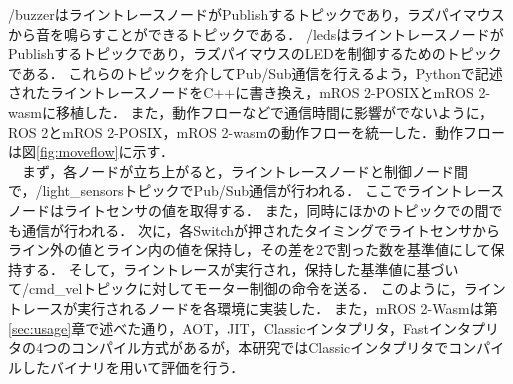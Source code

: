 /buzzerはライントレースノードがPublishするトピックであり，ラズパイマウスから音を鳴らすことができるトピックである．
/ledsはライントレースノードがPublishするトピックであり，ラズパイマウスのLEDを制御するためのトピックである．
これらのトピックを介してPub/Sub通信を行えるよう，Pythonで記述されたライントレースノードをC++に書き換え，mROS 2-POSIXとmROS 2-wasmに移植した．
また，動作フローなどで通信時間に影響がでないように，ROS 2とmROS 2-POSIX，mROS 2-wasmの動作フローを統一した．動作フローは図\ref{fig:moveflow}に示す．
\\　まず，各ノードが立ち上がると，ライントレースノードと制御ノード間で，/light\_sensorsトピックでPub/Sub通信が行われる．
ここでライントレースノードはライトセンサの値を取得する．
また，同時にほかのトピックでの間でも通信が行われる．
次に，各Switchが押されたタイミングでライトセンサからライン外の値とライン内の値を保持し，その差を2で割った数を基準値にして保持する．
そして，ライントレースが実行され，保持した基準値に基づいて/cmd\_velトピックに対してモーター制御の命令を送る．
このように，ライントレースが実行されるノードを各環境に実装した．
また，mROS 2-Wasmは第\ref{sec:usage}章で述べた通り，AOT，JIT，Classicインタプリタ，Fastインタプリタの4つのコンパイル方式があるが，本研究ではClassicインタプリタでコンパイルしたバイナリを用いて評価を行う．

